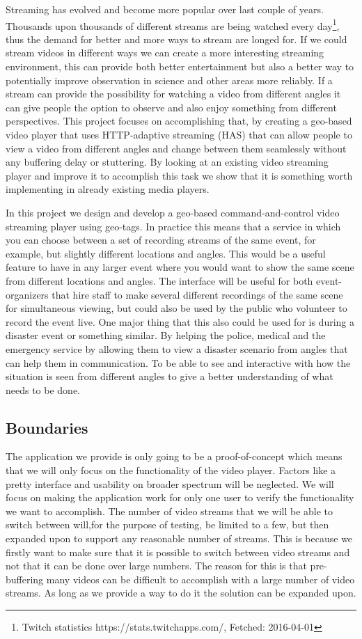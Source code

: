 \documentclass[9pt,a4paper]{acmproc}
\begin{document}
Streaming has evolved and become more popular over last couple of years. Thousands upon thousands of different streams are being watched every day\footnote{Twitch statistics https://stats.twitchapps.com/, Fetched: 2016-04-01}, thus the demand for better and more ways to stream are longed for. If we could stream videos in different ways we can create a more interesting streaming environment, this can provide both better entertainment but also a better way to potentially improve observation in science and other areas more reliably. If a stream can provide the possibility for watching a video from different angles it can give people the option to observe and also enjoy something from different perspectives. This project focuses on accomplishing that, by creating a geo-based video player that uses HTTP-adaptive streaming (HAS) that can allow people to view a video from different angles and change between them seamlessly without any buffering delay or stuttering. By looking at an existing video streaming player and improve it to accomplish this task we show that it is something worth implementing in already existing media players.

In this project we design and develop a geo-based command-and-control video streaming player using geo-tags. In practice this means that a service in which you can choose between a set of recording streams of the same event, for example, but slightly different locations and angles. This would be a useful feature to have in any larger event where you would want to show the same scene from different locations and angles. The interface will be useful for both event-organizers that hire staff to make several different recordings of the same scene for simultaneous viewing, but could also be used by the public who volunteer to record the event live. One major thing that this also could be used for is during a disaster event or something similar. By helping the police, medical and the emergency service by allowing them to view a disaster scenario from angles that can help them in communication. To be able to see and interactive with how the situation is seen from different angles to give a better understanding of what needs to be done.

\subsection{Boundaries}
The application we provide is only going to be a proof-of-concept which means that we will only focus on the functionality of the video player. Factors like a pretty interface and usability on broader spectrum will be neglected. We will focus on making the application work for only one user to verify the functionality we want to accomplish. The number of video streams that we will be able to switch between will,for the purpose of testing, be limited to a few, but then expanded upon to support any reasonable number of streams. This is because we firstly want to make sure that it is possible to switch between video streams and not that it can be done over large numbers. The reason for this is that pre-buffering many videos can be difficult to accomplish with a large number of video streams. As long as we provide a way to do it the solution can be expanded upon.
\end{document}
